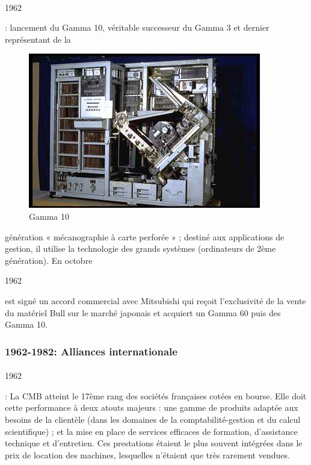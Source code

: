 \documentclass[11pt]{article}
\begin{document}
		\paragraph{}
		\begin{bf}1962\end{bf}: lancement du Gamma 10, véritable successeur du Gamma 3 et dernier représentant de la 
		\begin{figure}
		\includegraphics[scale=0.25]{gamma10.jpg}
		\caption{Gamma 10}
		\end{figure}
		génération « mécanographie à carte perforée » ; destiné aux applications de gestion, il utilise la technologie des 
		grands systèmes (ordinateurs de 2ème génération). En octobre \begin{bf}1962\end{bf} est signé un accord commercial 
		avec Mitsubishi qui reçoit l'exclusivité de la vente du matériel Bull sur le marché japonais et acquiert  un Gamma 60 
		puis des Gamma 10.
		\newline{}
		\newline{}
		\newline{}
		\newline{}
		\subsubsection{1962-1982: Alliances internationale}
		\paragraph{}
		\begin{bf}1962\end{bf}: La CMB atteint le 17ème rang des sociétés françaises cotées en bourse. Elle doit cette 
		performance à deux atouts majeurs : une gamme de produits adaptée aux besoins de la clientèle (dans les domaines de la 
		comptabilité-gestion et du calcul scientifique) ; et la mise en place de services efficaces de formation, d’assistance 
		technique et d’entretien. Ces prestations étaient le plus souvent intégrées dans le prix de location des machines, 
		lesquelles n’étaient que très rarement vendues.
\end{document}
